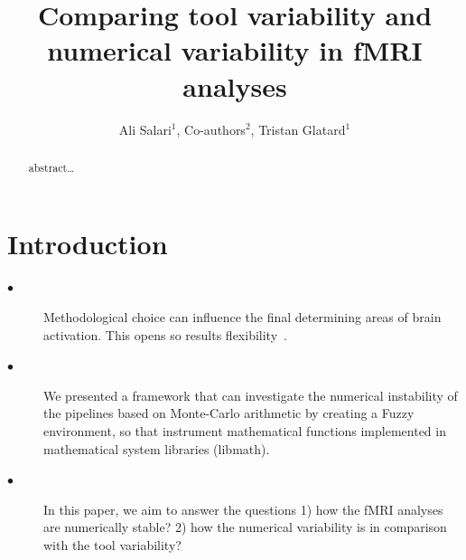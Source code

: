 \documentclass[runningheads]{llncs}
\begin{document}
\title{Comparing tool variability and numerical variability in fMRI analyses}

\author{Ali Salari$^1$, Co-authors$^2$, Tristan Glatard$^1$}




\maketitle              %

\begin{abstract}
abstract\dots

\end{abstract}


\section{Introduction}

\begin{description}
  \item[$\bullet$ ] Methodological choice can influence the final determining areas of brain activation. This opens so results flexibility~\cite{bowring2019exploring}. 

  \item[$\bullet$ ] We presented a framework that can investigate the numerical instability of the pipelines based on Monte-Carlo arithmetic
                    by creating a Fuzzy environment, so that instrument mathematical functions implemented in mathematical system libraries (libmath). 

  \item[$\bullet$ ] In this paper, we aim to answer the questions 1) how the fMRI analyses are numerically stable?
                    2) how the numerical variability is in comparison with the tool variability?
\end{description} 
\end{document}
